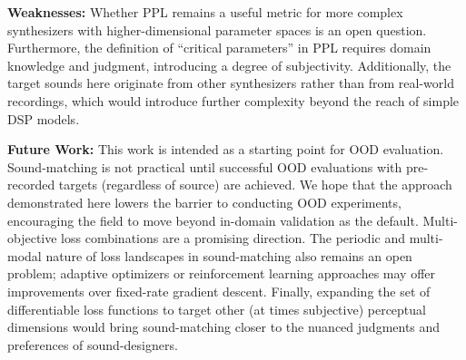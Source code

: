 \documentclass[10pt]{article} %
\begin{document}
\textbf{Weaknesses:} Whether PPL remains a useful metric for more complex synthesizers with higher-dimensional parameter spaces is an open question. Furthermore, the definition of ``critical parameters'' in PPL requires domain knowledge and judgment, introducing a degree of subjectivity. Additionally, the target sounds here originate from other synthesizers rather than from real-world recordings, which would introduce further complexity beyond the reach of simple DSP models.

\textbf{Future Work:} This work is intended as a starting point for OOD evaluation. Sound-matching is not practical until successful OOD evaluations with pre-recorded targets (regardless of source) are achieved. We hope that the approach demonstrated here lowers the barrier to conducting OOD experiments, encouraging the field to move beyond in-domain validation as the default.  Multi-objective loss combinations are a promising direction. The periodic and multi-modal nature of loss landscapes in sound-matching also remains an open problem; adaptive optimizers or reinforcement learning approaches may offer improvements over fixed-rate gradient descent. Finally, expanding the set of differentiable loss functions to target other (at times subjective) perceptual dimensions would bring sound-matching closer to the nuanced judgments and preferences of sound-designers.




\end{document}
